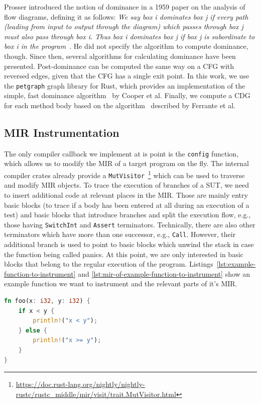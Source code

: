 \documentclass{article}
\begin{document}
Prosser introduced the notion of dominance in a 1959 paper on the analysis of flow diagrams, defining it as follows:
\textit{We say box i dominates box j if every path (leading from input to output through the diagram) which passes through box j must also pass through box i. Thus box i dominates box j if box j is subordinate to box i in the program}~\cite{Prosser1959}. He did not specify the algorithm to compute dominance, though. Since then, several algorithms for calculating dominance have been presented. Post-dominance can be computed the same way on a \ac{CFG} with reversed edges, given that the \ac{CFG} has a single exit point. In this work, we use the \lstinline{petgraph} graph library for Rust, which provides an implementation of the simple, fast dominance algorithm~\cite{Cooper2001} by Cooper et al. Finally, we compute a \ac{CDG} for each method body based on the algorithm~\cite{Ferrante1987} described by Ferrante et al.

\subsection{MIR Instrumentation}
The only compiler callback we implement at is point is the \lstinline{config} function, which allows us to modify the \ac{MIR} of a target program on the fly. The internal compiler crates already provide a \lstinline{MutVisitor}~\footnote{\url{https://doc.rust-lang.org/nightly/nightly-rustc/rustc_middle/mir/visit/trait.MutVisitor.html}} which can be used to traverse and modify \ac{MIR} objects. To trace the execution of branches of a \ac{SUT}, we need to insert additional code at relevant places in the \ac{MIR}. Those are mainly entry basic blocks (to trace if a body has been entered at all during an execution of a test) and basic blocks that introduce branches and split the execution flow, e.g., those having \lstinline{SwitchInt} and \lstinline{Assert} terminators. Technically, there are also other terminators which have more than one successor, e.g., \lstinline{Call}. However, their additional branch is used to point to basic blocks which unwind the stack in case the function being called panics. At this point, we are only interested in basic blocks that belong to the regular execution of the program. Listings~\ref{lst:example-function-to-instrument} and \ref{lst:mir-of-example-function-to-instrument} show an example function we want to instrument and the relevant parts of it's \ac{MIR}.

\begin{lstlisting}[language=Rust, style=boxed, caption={Example function to instrument}, label=lst:example-function-to-instrument]
fn foo(x: i32, y: i32) {
    if x < y {
        println!("x < y");
    } else {
        println!("x >= y");
    }
}
\end{lstlisting}
\end{document}
